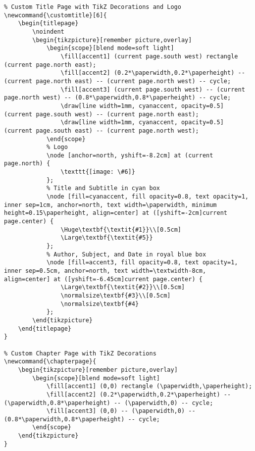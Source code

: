 \documentclass[openany]{book}
\begin{document}
\begin{longlisting}
\begin{verbatim}
% Custom Title Page with TikZ Decorations and Logo
\newcommand{\customtitle}[6]{
    \begin{titlepage}
        \noindent
        \begin{tikzpicture}[remember picture,overlay]
            \begin{scope}[blend mode=soft light]
                \fill[accent1] (current page.south west) rectangle (current page.north east);
                \fill[accent2] (0.2*\paperwidth,0.2*\paperheight) -- (current page.north east) -- (current page.north west) -- cycle;
                \fill[accent3] (current page.south west) -- (current page.north west) -- (0.8*\paperwidth,0.8*\paperheight) -- cycle;
                \draw[line width=1mm, cyanaccent, opacity=0.5] (current page.south west) -- (current page.north east);
                \draw[line width=1mm, cyanaccent, opacity=0.5] (current page.south east) -- (current page.north west);
            \end{scope}
            % Logo
            \node [anchor=north, yshift=-8.2cm] at (current page.north) {
                \texttt{[image: \#6]}
            };
            % Title and Subtitle in cyan box
            \node [fill=cyanaccent, fill opacity=0.8, text opacity=1, inner sep=1cm, anchor=north, text width=\paperwidth, minimum height=0.15\paperheight, align=center] at ([yshift=-2cm]current page.center) {
                \Huge\textbf{\textit{#1}}\\[0.5cm]
                \Large\textbf{\textit{#5}}
            };
            % Author, Subject, and Date in royal blue box
            \node [fill=accent3, fill opacity=0.8, text opacity=1, inner sep=0.5cm, anchor=north, text width=\textwidth-8cm, align=center] at ([yshift=-6.45cm]current page.center) {
                \Large\textbf{\textit{#2}}\\[0.5cm]
                \normalsize\textbf{#3}\\[0.5cm]
                \normalsize\textbf{#4}
            };
        \end{tikzpicture}
    \end{titlepage}
}

% Custom Chapter Page with TikZ Decorations
\newcommand{\chapterpage}{
    \begin{tikzpicture}[remember picture,overlay]
        \begin{scope}[blend mode=soft light]
            \fill[accent1] (0,0) rectangle (\paperwidth,\paperheight);
            \fill[accent2] (0.2*\paperwidth,0.2*\paperheight) -- (\paperwidth,0.8*\paperheight) -- (\paperwidth,0) -- cycle;
            \fill[accent3] (0,0) -- (\paperwidth,0) -- (0.8*\paperwidth,0.8*\paperheight) -- cycle;
        \end{scope}
    \end{tikzpicture}
}


\end{verbatim}
\end{longlisting}
\end{document}
